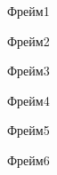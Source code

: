 \documentclass[t]{beamer}
\begin{document}
\begin{frame}
    Фрейм1
\end{frame}

\begin{frame}
    Фрейм2
\end{frame}

\begin{frame}
    Фрейм3
\end{frame}

\begin{frame}
    Фрейм4
\end{frame}

\begin{frame}
    Фрейм5
\end{frame}

\begin{frame}
    Фрейм6
\end{frame}
\end{document}
